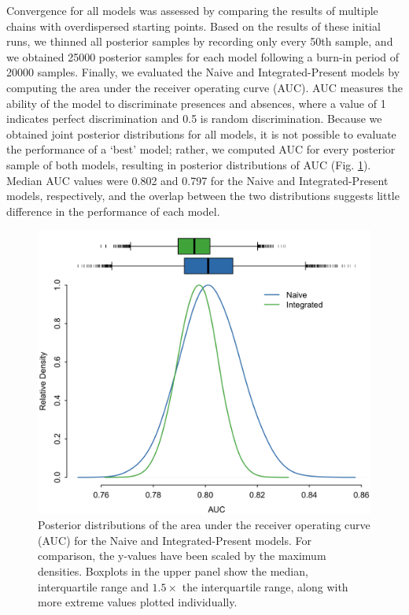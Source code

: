 \documentclass[11pt]{article}
\begin{document}
Convergence for all models was assessed by comparing the results of multiple chains with overdispersed starting points.
Based on the results of these initial runs, we thinned all posterior samples by recording only every 50th sample, and we obtained 25000 posterior samples for each model following a burn-in period of 20000 samples.
Finally, we evaluated the Naive and Integrated-Present models by computing the area under the receiver operating curve (AUC).
AUC measures the ability of the model to discriminate presences and absences, where a value of 1 indicates perfect discrimination and 0.5 is random discrimination.
Because we obtained joint posterior distributions for all models, it is not possible to evaluate the performance of a `best' model; rather, we computed AUC for every posterior sample of both models, resulting in posterior distributions of AUC (Fig. \ref{fig:auc}).
Median AUC values were 0.802 and 0.797 for the Naive and Integrated-Present models, respectively, and the overlap between the two distributions suggests little difference in the performance of each model.

\begin{figure}
\includegraphics[width=5.5in]{figs/ex2_auc.png}
\caption{Posterior distributions of the area under the receiver operating curve (AUC) for the Naive and Integrated-Present models. For comparison, the y-values have been scaled by the maximum densities. Boxplots in the upper panel show the median, interquartile range and \(1.5 \times\) the interquartile range, along with more extreme values plotted individually.}
\label{fig:auc}
\end{figure}
\end{document}
